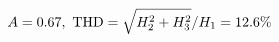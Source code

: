 \documentclass[preview]{standalone}
\begin{document}
\begin{align*}
\special{dvisvgm:raw <g id='unique000'>}A=0.67,\ \text{THD}=\sqrt{H_2^2+H_3^2}/H_1=12.6\%\special{dvisvgm:raw </g>}
\end{align*}
\end{document}
